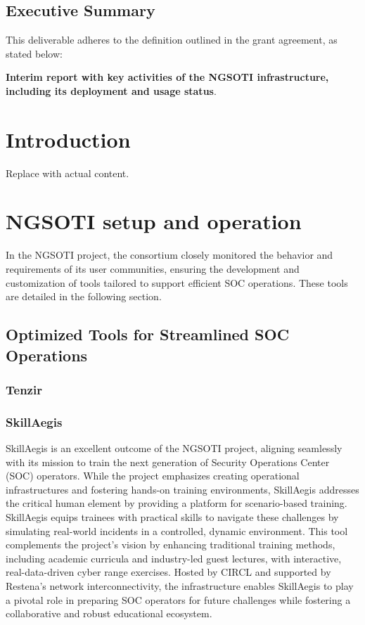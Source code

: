 \section*{Executive Summary}

This deliverable adheres to the definition outlined in the grant agreement, as stated below:

\textbf{ Interim report with key activities of the NGSOTI infrastructure, including its deployment and usage status}.


\chapter{Introduction}
Replace with actual content.

\chapter{NGSOTI setup and operation}
In the NGSOTI project, the consortium closely monitored the behavior and requirements of its user communities, ensuring the development and customization of tools tailored to support efficient SOC operations. These tools are detailed in the following section.

\section{Optimized Tools for Streamlined SOC Operations}


\subsection{Tenzir}


\subsection{SkillAegis}
SkillAegis is an excellent outcome of the NGSOTI project, aligning seamlessly with its mission to train the next generation of Security Operations Center (SOC) operators. While the project emphasizes creating operational infrastructures and fostering hands-on training environments, SkillAegis addresses the critical human element by providing a platform for scenario-based training.
SkillAegis equips trainees with practical skills to navigate these challenges by simulating real-world incidents in a controlled, dynamic environment.
This tool complements the project's vision by enhancing traditional training methods, including academic curricula and industry-led guest lectures, with interactive, real-data-driven cyber range exercises. Hosted by CIRCL and supported by Restena's network interconnectivity, the infrastructure enables SkillAegis to play a pivotal role in preparing SOC operators for future challenges while fostering a collaborative and robust educational ecosystem.

